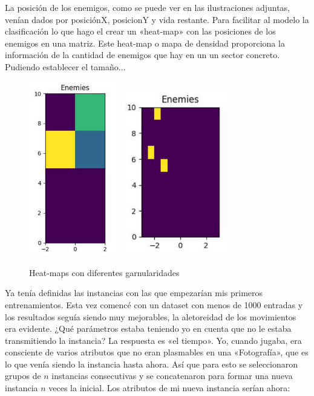La posición de los enemigos, como se puede ver en las ilustraciones adjuntas, venían dados por posiciónX, posicionY y vida restante. Para facilitar al modelo la clasificación lo que hago el crear un «heat-map» con las posiciones de los enemigos en una matriz. Este heat-map o mapa de densidad proporciona la información de la cantidad de enemigos que hay en un un sector concreto. Pudiendo establecer el tamaño... 

\begin{figure}[]
  \centering
  \includegraphics[width=0.35\textwidth]{../img/enemies_heat_map}\label{fig:f1}
  \hfill
\includegraphics[width=0.43\textwidth]{../img/enemies_heat_map_1}\label{fig:f2}
  \caption{Heat-maps con diferentes garnularidades}
\end{figure}



Ya tenía definidas las instancias con las que empezarían mis primeros entrenamientos. Esta vez comencé con un dataset con menos de 1000 entradas y los resultados seguía siendo muy mejorables, la aletoreidad de los movimientos era evidente. ¿Qué parámetros estaba teniendo yo en cuenta que no le estaba transmitiendo la instancia? La respuesta es «el tiempo». Yo, cuando jugaba, era consciente de varios atributos que no eran plasmables en una «Fotografía», que es lo que venía siendo la instancia hasta ahora. Así que para esto se seleccionaron grupos de $n$ instancias consecutivas y se concatenaron para formar una nueva instancia $n$ veces la inicial. Los atributos de mi nueva instancia serían ahora:

